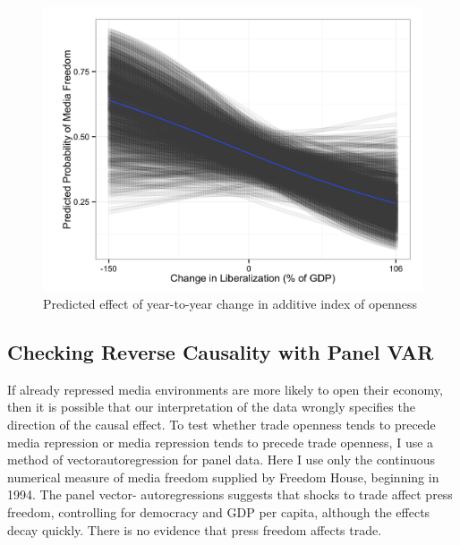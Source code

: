 \documentclass[12pt]{report}
\begin{document}
\begin{centering}
\begin{figure}
\includegraphics[scale=0.2]{article2_liberalization_effect_plot.png}
\caption{Predicted effect of year-to-year change in additive index of openness}
\end{figure}

\end{centering}

\subsection{Checking Reverse Causality with Panel VAR}

If already repressed media environments are more likely to open their economy, then it is possible
that our interpretation of the data wrongly specifies the direction of the causal effect. To test
whether trade openness tends to precede media repression or media repression tends to precede trade
openness, I use a method of vectorautoregression for panel data. Here I use only the continuous
numerical measure of media freedom supplied by Freedom House, beginning in 1994. The panel vector-
autoregressions suggests that shocks to trade affect press freedom, controlling for democracy and
GDP per capita, although the effects decay quickly. There is no evidence that press freedom affects
trade.
\end{document}
